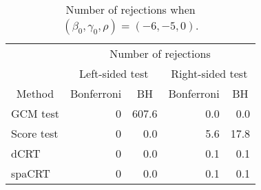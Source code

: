 \begin{table}[!h]
\centering
\caption{\label{tab:simulation_rejection_beta_-6_gamma_-5}Number of rejections when $(\beta_0,\gamma_0,\rho) = (-6, -5, 0)$.}
\centering
\begin{tabular}[t]{lrrrr}
\toprule
\multicolumn{1}{c}{ } & \multicolumn{4}{c}{Number of rejections} \\
\cmidrule(l{3pt}r{3pt}){2-5}
\multicolumn{1}{c}{ } & \multicolumn{2}{c}{Left-sided test} & \multicolumn{2}{c}{Right-sided test} \\
\cmidrule(l{3pt}r{3pt}){2-3} \cmidrule(l{3pt}r{3pt}){4-5}
\multicolumn{1}{c}{Method} & \multicolumn{1}{c}{Bonferroni} & \multicolumn{1}{c}{BH} & \multicolumn{1}{c}{Bonferroni} & \multicolumn{1}{c}{BH} \\
\cmidrule(l{3pt}r{3pt}){1-1} \cmidrule(l{3pt}r{3pt}){2-2} \cmidrule(l{3pt}r{3pt}){3-3} \cmidrule(l{3pt}r{3pt}){4-4} \cmidrule(l{3pt}r{3pt}){5-5}
GCM test & 0 & 607.6 & 0.0 & 0.0\\
Score test & 0 & 0.0 & 5.6 & 17.8\\
dCRT & 0 & 0.0 & 0.1 & 0.1\\
spaCRT & 0 & 0.0 & 0.1 & 0.1\\
\bottomrule
\end{tabular}
\end{table}

